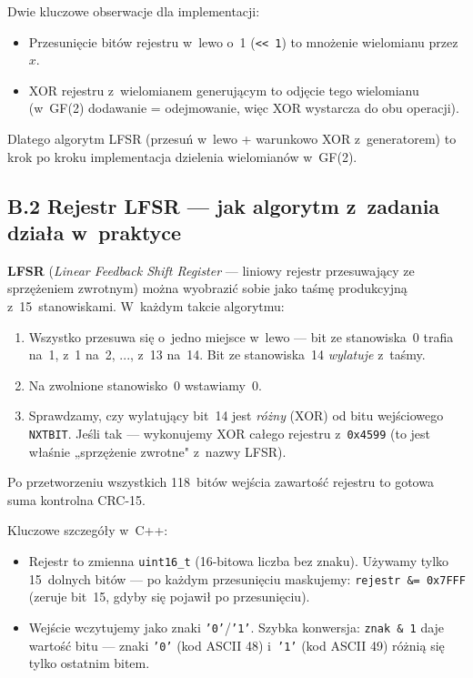 \documentclass[12pt,a4paper]{article}
\begin{document}
Dwie kluczowe obserwacje dla implementacji:
\begin{itemize}
    \item Przesunięcie bitów rejestru w~lewo o~1 (\texttt{<<\,1}) to mnożenie
          wielomianu przez $x$.
    \item XOR rejestru z~wielomianem generującym to odjęcie tego wielomianu
          (w~GF(2) dodawanie = odejmowanie, więc XOR wystarcza do obu operacji).
\end{itemize}
Dlatego algorytm LFSR (przesuń w~lewo + warunkowo XOR z~generatorem) to
krok po kroku implementacja dzielenia wielomianów w~GF(2).

\subsection*{B.2 Rejestr LFSR — jak algorytm z~zadania działa w~praktyce}

\textbf{LFSR} (\textit{Linear Feedback Shift Register} — liniowy rejestr
przesuwający ze sprzężeniem zwrotnym) można wyobrazić sobie jako taśmę
produkcyjną z~15~stanowiskami. W~każdym takcie algorytmu:
\begin{enumerate}[label=\arabic*.]
    \item Wszystko przesuwa się o~jedno miejsce w~lewo — bit ze stanowiska~0
          trafia na~1, z~1 na~2, ..., z~13 na~14. Bit ze stanowiska~14
          \emph{wylatuje} z~taśmy.
    \item Na zwolnione stanowisko~0 wstawiamy~0.
    \item Sprawdzamy, czy wylatujący bit~14 jest \emph{różny} (XOR) od bitu
          wejściowego \texttt{NXTBIT}. Jeśli tak — wykonujemy XOR całego
          rejestru z~\texttt{0x4599} (to jest właśnie „sprzężenie zwrotne"
          z~nazwy LFSR).
\end{enumerate}

Po przetworzeniu wszystkich 118~bitów wejścia zawartość rejestru to gotowa
suma kontrolna CRC-15.

Kluczowe szczegóły w~C++:
\begin{itemize}
    \item Rejestr to zmienna \texttt{uint16\_t} (16-bitowa liczba bez znaku).
          Używamy tylko 15~dolnych bitów — po każdym przesunięciu maskujemy:
          \texttt{rejestr \&= 0x7FFF} (zeruje bit~15, gdyby się pojawił po
          przesunięciu).
    \item Wejście wczytujemy jako znaki \texttt{'0'}/\texttt{'1'}.
          Szybka konwersja: \texttt{znak \& 1} daje wartość bitu — znaki
          \texttt{'0'} (kod ASCII 48) i~\texttt{'1'} (kod ASCII 49) różnią
          się tylko ostatnim bitem.
\end{itemize}
\end{document}
